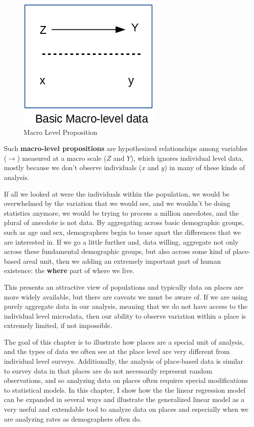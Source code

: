 \documentclass[
]{article}
\begin{document}
\begin{figure}
\centering
\includegraphics{images/macro2.png}
\caption{Macro Level Proposition}
\end{figure}

Such \textbf{macro-level propositions} are hypothesized relationships among variables (\(\rightarrow\)) measured at a macro scale (\(Z\) and \(Y\)), which ignores individual level data, mostly because we don't observe individuals (\(x\) and \(y\)) in many of these kinds of analysis.

If all we looked at were the individuals within the population, we would be overwhelmed by the variation that we would see, and we wouldn't be doing statistics anymore, we would be trying to process a million anecdotes, and the plural of anecdote is not data. By aggregating across basic demographic groups, such as age and sex, demographers begin to tease apart the differences that we are interested in. If we go a little further and, data willing, aggregate not only across these fundamental demographic groups, but also across some kind of place-based areal unit, then we adding an extremely important part of human existence: the \textbf{where} part of where we live.

This presents an attractive view of populations and typically data on places are more widely available, but there are caveats we must be aware of. If we are using purely aggregate data in our analysis, meaning that we do not have access to the individual level microdata, then our ability to observe variation within a place is extremely limited, if not impossible.

The goal of this chapter is to illustrate how places are a special unit of analysis, and the types of data we often see at the place level are very different from individual level surveys. Additionally, the analysis of place-based data is similar to survey data in that places are do not necessarily represent random observations, and so analyzing data on places often requires special modifications to statistical models. In this chapter, I show how the the linear regression model can be expanded in several ways and illustrate the generalized linear model as a very useful and extendable tool to analyze data on places and especially when we are analyzing rates as demographers often do.
\end{document}
